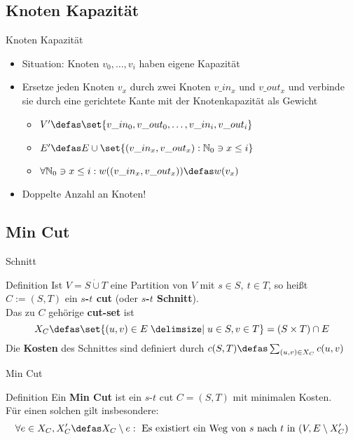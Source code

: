 \subsection{Knoten Kapazität}
\begin{frame}{Knoten Kapazität}
    \begin{itemize}
        \pause\item Situation: Knoten $v_0,\dots,v_i$ haben eigene Kapazität
        \pause\item Ersetze jeden Knoten $v_x$ durch zwei Knoten $v\_in_x$ und
        $v\_out_x$ und verbinde sie durch eine gerichtete Kante mit der Knotenkapazität als Gewicht
        \begin{itemize}
        \pause\item \(V' \defas \set{v\_in_0, v\_out_0, \dots, v\_in_i, v\_out_i}\)
        \pause\item \(E' \defas E \cup \set{(v\_in_x, v\_out_x) : \mathbb{N}_0 \ni x \leq i}\)
        \pause\item \(\forall \mathbb{N}_0 \ni x \leq i : w((v\_in_x, v\_out_x)) \defas w(v_x)\)
        \end{itemize}
        \pause\item Doppelte Anzahl an Knoten!
    \end{itemize}
\end{frame}

\subsection{Min Cut}
\begin{frame}{Schnitt}
    \begin{block}{Definition}
        \pause Ist \(V = S \dot{\cup} T\) eine Partition von \(V\) mit \(s \in S, \ t \in T\), so heißt \(C := (S, T)\) ein \textbf{$s$-$t$ cut} (oder \textbf{$s$-$t$ Schnitt}).\\\pause
        Das zu $C$ gehörige \textbf{cut-set} ist
        \[X_C \defas \set{(u, v) \in E \given u \in S, v \in T} = (S\times
        T)\cap E\]
        \pause
        Die \textbf{Kosten} des Schnittes sind definiert durch
        \(c(S, T) \defas \sum\nolimits_{(u, v) \in X_C} c(u, v)\)
    \end{block}
\end{frame}

\begin{frame}{Min Cut}
    \begin{block}{Definition}
        \pause Ein \textbf{Min Cut} ist ein $s$-$t$ cut \(C = (S, T)\) mit minimalen Kosten.\\\pause
        Für einen solchen gilt insbesondere:
        \[\forall e \in X_C, X_C' \defas X_C \setminus e :
        \text{ Es existiert ein Weg von $s$ nach $t$ in } (V, E \setminus X_C')\]
    \end{block}
\end{frame}

